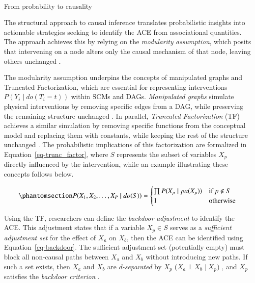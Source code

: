 \documentclass[
  authoryear,
  review,
  1p]{elsarticle}
\makeatletter
\let\oldparagraph\paragraph
\renewcommand{\paragraph}{
    \@ifstar
      \xxxParagraphStar
      \xxxParagraphNoStar
  }
\newcommand{\xxxParagraphStar}[1]{\oldparagraph*{#1}\mbox{}}
\newcommand{\xxxParagraphNoStar}[1]{\oldparagraph{#1}\mbox{}}
\makeatother
\begin{document}
\paragraph{From probability to causality}\label{sec-appendixB33}

The structural approach to causal inference translates probabilistic
insights into actionable strategies seeking to identify the ACE from
associational quantities. The approach achieves this by relying on the
\emph{modularity assumption}, which posits that intervening on a node
alters only the causal mechanism of that node, leaving others unchanged
\citep[pp.~34]{Neal_2020}.

The modularity assumption underpins the concepts of manipulated graphs
and Truncated Factorization, which are essential for representing
interventions \(P(Y_{i} \mid do(T_{i}=t))\) within SCMs and DAGs.
\emph{Manipulated graphs} simulate physical interventions by removing
specific edges from a DAG, while preserving the remaining structure
unchanged \citep[pp.~34]{Neal_2020}. In parallel, \emph{Truncated
Factorization} (TF) achieves a similar simulation by removing specific
functions from the conceptual model and replacing them with constants,
while keeping the rest of the structure unchanged \citep{Pearl_2010}.
The probabilistic implications of this factorization are formalized in
Equation~\ref{eq-trunc_factor}, where \(S\) represents the subset of
variables \(X_{p}\) directly influenced by the intervention, while an
example illustrating these concepts follows below.

\begin{equation}\phantomsection\label{eq-trunc_factor}{
P(X_{1}, X_{2}, \dots, X_{P} \mid do(S)) =
\begin{cases}
  \prod P(X_{p} \mid pa(X_{p}) ) & \text{if} \: p \not\in S \\
  1 \quad & \text{otherwise}
\end{cases}
}\end{equation}

Using the TF, researchers can define the \emph{backdoor adjustment} to
identify the ACE. This adjustment states that if a variable
\(X_{p} \in S\) serves as a \emph{sufficient adjustment set} for the
effect of \(X_{a}\) on \(X_{b}\), then the ACE can be identified using
Equation~\ref{eq-backdoor}. The sufficient adjustment set (potentially
empty) must block all non-causal paths between \(X_{a}\) and \(X_{b}\)
without introducing new paths. If such a set exists, then \(X_{a}\) and
\(X_{b}\) are \emph{d-separated} by \(X_{p}\)
(\(X_{a} \:\bot\:X_{b} \mid X_{p}\)) \citep{Pearl_2009}, and \(X_{p}\)
satisfies the \emph{backdoor criterion} \citep[pp.~37]{Neal_2020}.
\end{document}
